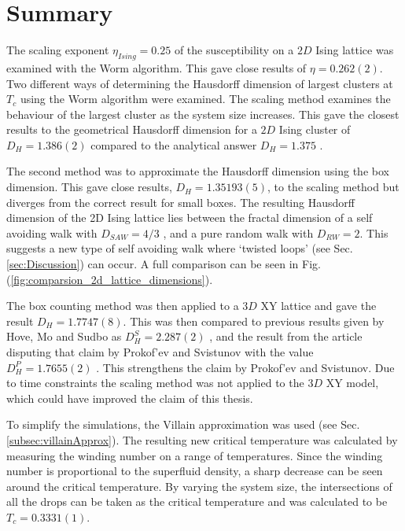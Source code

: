 \section{Summary}
\label{sec:Summary}

The scaling exponent $\eta_{Ising} = 0.25$ of the susceptibility on a $2D$ Ising lattice was examined with the Worm algorithm. This gave close results of $\eta = 0.262(2)$. Two different ways of determining the Hausdorff dimension of largest clusters at $T_c$ using the Worm algorithm were examined. The scaling method examines the behaviour of the largest cluster as the system size increases. This gave the closest results to the geometrical Hausdorff dimension for a $2D$ Ising cluster of $D_H = 1.386(2)$ compared to the analytical answer $D_H = 1.375$ \cite{Duplantier:GeoHausdorff}.

The second method was to approximate the Hausdorff dimension using the box dimension. This gave close results, $D_H = 1.35193(5)$, to the scaling method but diverges from the correct result for small boxes. The resulting Hausdorff dimension of the 2D Ising lattice lies between the fractal dimension of a self avoiding walk with $D_{SAW} = 4/3$ \cite{Vilgis:FlorySAW}, and a pure random walk with $D_{RW} = 2$. This suggests a new type of self avoiding walk where `twisted loops' (see Sec. \ref{sec:Discussion}) can occur. A full comparison can be seen in Fig. (\ref{fig:comparsion_2d_lattice_dimensions}).

The box counting method was then applied to a $3D$ XY lattice and gave the result $D_H = 1.7747(8)$. This was then compared to previous results given by Hove, Mo and Sudbo as $D_H^S = 2.287(2)$ \cite{Hove:hausdorff_crit_fluctuations}, and the result from the article disputing that claim by Prokof'ev and Svistunov with the value $D_H^P = 1.7655(2)$ \cite{Prokofev:comment_on_hove_hausdorff_crit_fluct}. This strengthens the claim by Prokof'ev and Svistunov. Due to time constraints the scaling method was not applied to the $3D$ XY model, which could have improved the claim of this thesis.

To simplify the simulations, the Villain approximation was used (see Sec. \ref{subsec:villainApprox}). The resulting new critical temperature was calculated by measuring the winding number on a range of temperatures. Since the winding number is proportional to the superfluid density, a sharp decrease can be seen around the critical temperature. By varying the system size, the intersections of all the drops can be taken as the critical temperature and was calculated to be $T_c = 0.3331(1)$.

